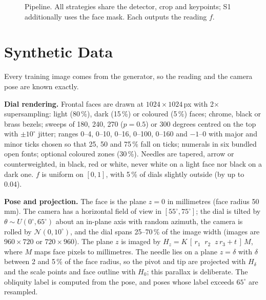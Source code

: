 \documentclass[conference]{IEEEtran}
\begin{document}
\begin{figure}[t]
\centering
{}
\caption{Pipeline. All strategies share the detector, crop and keypoints; S1 additionally uses the face mask.
Each outputs the reading $f$.}
\label{fig:pipeline}
\end{figure}

\section{Synthetic Data}\label{sec:data}
Every training image comes from the generator, so the reading and the camera pose are known exactly.

\textbf{Dial rendering.} Frontal faces are drawn at $1024\times1024$\,px with 2$\times$ supersampling: light
(80\,\%), dark (15\,\%) or coloured (5\,\%) faces; chrome, black or brass bezels; sweeps of 180, 240, 270
($p=0.5$) or 300 degrees centred on the top with $\pm10^\circ$ jitter; ranges 0--4, 0--10, 0--16, 0--100, 0--160
and $-1$--0 with major and minor ticks chosen so that 25, 50 and 75\,\% fall on ticks; numerals in six bundled
open fonts; optional coloured zones (30\,\%). Needles are tapered, arrow or counterweighted, in black, red or
white, never white on a light face nor black on a dark one. $f$ is uniform on $[0,1]$, with 5\,\% of dials
slightly outside (by up to 0.04).

\textbf{Pose and projection.} The face is the plane $z=0$ in millimetres (face radius 50\,mm). The camera has a
horizontal field of view in $[55^\circ,75^\circ]$; the dial is tilted by $\theta\sim U(0^\circ,65^\circ)$
about an in-plane axis with random azimuth, the camera is rolled by $\mathcal N(0,10^\circ)$, and the dial spans
25--70\,\% of the image width (images are $960\times720$ or $720\times960$). The plane $z$ is imaged by
$H_z = K\,[\,r_1\;\; r_2\;\; z\,r_3 + t\,]\,M$, where $M$ maps face pixels to millimetres. The needle lies on a
plane $z=\delta$ with $\delta$ between 2 and 5\,\% of the face radius, so the pivot and tip are projected with
$H_\delta$ and the scale points and face outline with $H_0$; this parallax is deliberate. The obliquity label is
computed from the pose, and poses whose label exceeds $65^\circ$ are resampled.
\end{document}
